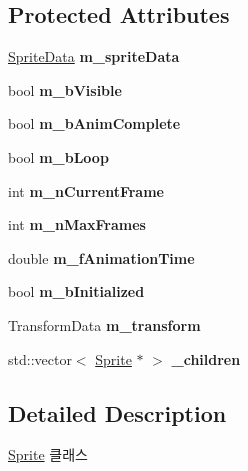 \subsection*{Protected Attributes}
\begin{DoxyCompactItemize}
\item 
\mbox{\label{class_sprite_ab87c8ed476119904bbe282ab7bed9fcd}} 
\mbox{\hyperlink{struct_sprite_data}{Sprite\+Data}} {\bfseries m\+\_\+sprite\+Data}
\item 
\mbox{\label{class_sprite_a5c907ed0f4f38944fe80304a1c636d33}} 
bool {\bfseries m\+\_\+b\+Visible}
\item 
\mbox{\label{class_sprite_a2fb3896ec487fc65ded8f3b5686aeb99}} 
bool {\bfseries m\+\_\+b\+Anim\+Complete}
\item 
\mbox{\label{class_sprite_a63568381e61a508714de4b14d367db85}} 
bool {\bfseries m\+\_\+b\+Loop}
\item 
\mbox{\label{class_sprite_a3f7445f1c5caa23248383be8f529e636}} 
int {\bfseries m\+\_\+n\+Current\+Frame}
\item 
\mbox{\label{class_sprite_aa415edd56c2c2a5de2db34176dee6ae6}} 
int {\bfseries m\+\_\+n\+Max\+Frames}
\item 
\mbox{\label{class_sprite_ad00393c1210dc9a79c0999e79b50c74c}} 
double {\bfseries m\+\_\+f\+Animation\+Time}
\item 
\mbox{\label{class_sprite_abae9742b98c4f44cd17d84c1f14df7ed}} 
bool {\bfseries m\+\_\+b\+Initialized}
\item 
\mbox{\label{class_sprite_ad11d1fd1bb62289383b63266225b6197}} 
Transform\+Data {\bfseries m\+\_\+transform}
\item 
\mbox{\label{class_sprite_aa43e0627a0876d04a0e1d21d24783307}} 
std\+::vector$<$ \mbox{\hyperlink{class_sprite}{Sprite}} $\ast$ $>$ {\bfseries \+\_\+children}
\end{DoxyCompactItemize}


\subsection{Detailed Description}
\mbox{\hyperlink{class_sprite}{Sprite}} 클래스 

